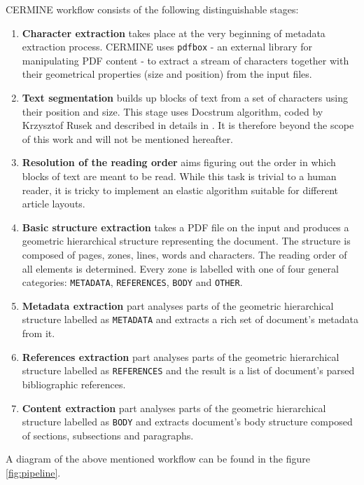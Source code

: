 CERMINE workflow consists of the following distinguishable stages:
\begin{enumerate}
    \item \textbf{Character extraction} takes place at the very beginning of metadata extraction process. CERMINE uses \verb+pdfbox+ - an external library for manipulating PDF content - to extract a stream of characters together with their geometrical properties (size and position) from the input files.
    \item \textbf{Text segmentation} builds up blocks of text from a set of characters using their position and size. This stage uses Docstrum algorithm, coded by Krzysztof Rusek and described in details in \cite{O'Gorman1993}. It is therefore beyond the scope of this work and will not be mentioned hereafter.
    \item \textbf{Resolution of the reading order} aims figuring out the order in which blocks of text are meant to be read. While this task is trivial to a human reader, it is tricky to implement an elastic algorithm suitable for different article layouts.
    \item \textbf{Basic structure extraction} takes a PDF file on the input and produces a geometric hierarchical structure representing the document. The structure is composed of pages, zones, lines, words and characters. The reading order of all elements is determined. Every zone is labelled with one of four general categories: \verb+METADATA+, \verb+REFERENCES+, \verb+BODY+ and \verb+OTHER+.
    \item \textbf{Metadata extraction} part analyses parts of the geometric hierarchical structure labelled as \verb+METADATA+ and extracts a rich set of document's metadata from it.
    \item \textbf{References extraction} part analyses parts of the geometric hierarchical structure labelled as \verb+REFERENCES+ and the result is a list of document's parsed bibliographic references.
    \item \textbf{Content extraction} part analyses parts of the geometric hierarchical structure labelled as \verb+BODY+ and extracts document's body structure composed of sections, subsections and paragraphs. 
\end{enumerate}
A diagram of the above mentioned workflow can be found in the figure \ref{fig:pipeline}.
